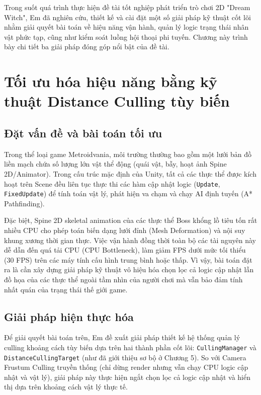 Trong suốt quá trình thực hiện đề tài tốt nghiệp phát triển trò chơi 2D "Dream Witch", Em đã nghiên cứu, thiết kế và cài đặt một số giải pháp kỹ thuật cốt lõi nhằm giải quyết bài toán về hiệu năng vận hành, quản lý logic trạng thái nhân vật phức tạp, cũng như kiểm soát luồng hội thoại phi tuyến. Chương này trình bày chi tiết ba giải pháp đóng góp nổi bật của đề tài.

\section{Tối ưu hóa hiệu năng bằng kỹ thuật Distance Culling tùy biến}

\subsection{Đặt vấn đề và bài toán tối ưu}
Trong thể loại game Metroidvania, môi trường thường bao gồm một lưới bản đồ liền mạch chứa số lượng lớn vật thể động (quái vật, bẫy, hoạt ảnh Spine 2D/Animator). Trong cấu trúc mặc định của Unity, tất cả các thực thể được kích hoạt trên Scene đều liên tục thực thi các hàm cập nhật logic (\texttt{Update}, \texttt{FixedUpdate}) để tính toán vật lý, phát hiện va chạm và chạy AI định tuyến (A* Pathfinding). 

Đặc biệt, Spine 2D skeletal animation của các thực thể Boss khổng lồ tiêu tốn rất nhiều CPU cho phép toán biến dạng lưới đỉnh (Mesh Deformation) và nội suy khung xương thời gian thực. Việc vận hành đồng thời toàn bộ các tài nguyên này dễ dẫn đến quá tải CPU (CPU Bottleneck), làm giảm FPS dưới mức tối thiểu (30 FPS) trên các máy tính cấu hình trung bình hoặc thấp. Vì vậy, bài toán đặt ra là cần xây dựng giải pháp kỹ thuật vô hiệu hóa chọn lọc cả logic cập nhật lẫn đồ họa của các thực thể ngoài tầm nhìn của người chơi mà vẫn bảo đảm tính nhất quán của trạng thái thế giới game.

\subsection{Giải pháp hiện thực hóa}
Để giải quyết bài toán trên, Em đề xuất giải pháp thiết kế hệ thống quản lý culling khoảng cách tùy biến dựa trên hai thành phần cốt lõi: \texttt{CullingManager} và \texttt{DistanceCullingTarget} (như đã giới thiệu sơ bộ ở Chương 5). So với Camera Frustum Culling truyền thống (chỉ dừng render nhưng vẫn chạy CPU logic cập nhật và vật lý), giải pháp này thực hiện ngắt chọn lọc cả logic cập nhật và hiển thị dựa trên khoảng cách vật lý thực tế.


